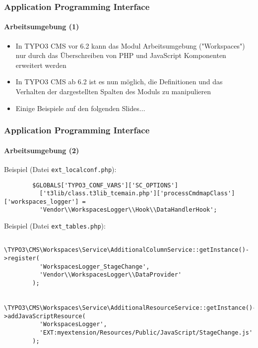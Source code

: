 
\begin{frame}[fragile]
	\frametitle{Application Programming Interface}
	\framesubtitle{Arbeitsumgebung (1)}

	\begin{itemize}
		\item In TYPO3 CMS vor 6.2 kann das Modul Arbeitsumgebung ("Workspaces") nur durch das Überschreiben von PHP und JavaScript Komponenten erweitert werden
		\item In TYPO3 CMS ab 6.2 ist es nun möglich, die Definitionen und das Verhalten der dargestellten Spalten des Moduls zu manipulieren
		\item Einige Beispiele auf den folgenden Slides...
	\end{itemize}

\end{frame}


\begin{frame}[fragile]
	\frametitle{Application Programming Interface}
	\framesubtitle{Arbeitsumgebung (2)}

	\lstset{
		basicstyle=\tiny\ttfamily
	}

	Beispiel (Datei \texttt{ext\_localconf.php}):

	\begin{lstlisting}
		$GLOBALS['TYPO3_CONF_VARS']['SC_OPTIONS']
		  ['t3lib/class.t3lib_tcemain.php']['processCmdmapClass']['workspaces_logger'] =
		  'Vendor\\WorkspacesLogger\\Hook\\DataHandlerHook';
	\end{lstlisting}

	Beispiel (Datei \texttt{ext\_tables.php}):

	\begin{lstlisting}
		\TYPO3\CMS\Workspaces\Service\AdditionalColumnService::getInstance()->register(
		  'WorkspacesLogger_StageChange',
		  'Vendor\\WorkspacesLogger\\DataProvider'
		);

		\TYPO3\CMS\Workspaces\Service\AdditionalResourceService::getInstance()->addJavaScriptResource(
		  'WorkspacesLogger',
		  'EXT:myextension/Resources/Public/JavaScript/StageChange.js'
		);
	\end{lstlisting}

\end{frame}

